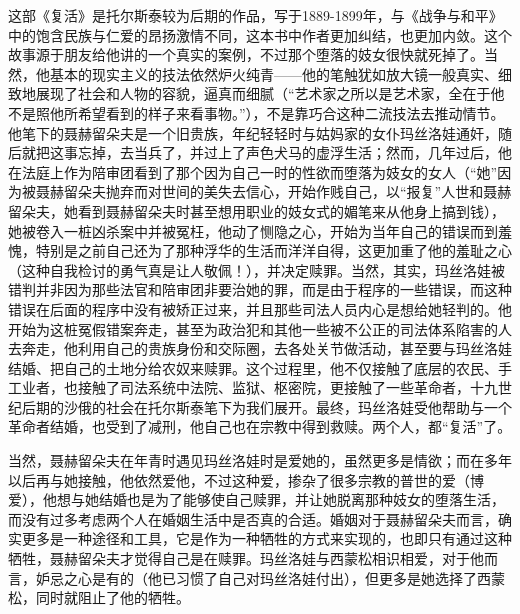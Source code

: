 这部《复活》是托尔斯泰较为后期的作品，写于1889-1899年，与《战争与和平》中的饱含民族与仁爱的昂扬激情不同，这本书中作者更加纠结，也更加内敛。这个故事源于朋友给他讲的一个真实的案例，不过那个堕落的妓女很快就死掉了。当然，他基本的现实主义的技法依然炉火纯青——他的笔触犹如放大镜一般真实、细致地展现了社会和人物的容貌，逼真而细腻（“艺术家之所以是艺术家，全在于他不是照他所希望看到的样子来看事物。”），不是靠巧合这种二流技法去推动情节。他笔下的聂赫留朵夫是一个旧贵族，年纪轻轻时与姑妈家的女仆玛丝洛娃通奸，随后就把这事忘掉，去当兵了，并过上了声色犬马的虚浮生活；然而，几年过后，他在法庭上作为陪审团看到了那个因为自己一时的性欲而堕落为妓女的女人（“她”因为被聂赫留朵夫抛弃而对世间的美失去信心，开始作贱自己，以“报复”人世和聂赫留朵夫，她看到聂赫留朵夫时甚至想用职业的妓女式的媚笔来从他身上搞到钱），她被卷入一桩凶杀案中并被冤枉，他动了恻隐之心，开始为当年自己的错误而到羞愧，特别是之前自己还为了那种浮华的生活而洋洋自得，这更加重了他的羞耻之心（这种自我检讨的勇气真是让人敬佩！），并决定赎罪。当然，其实，玛丝洛娃被错判并非因为那些法官和陪审团非要治她的罪，而是由于程序的一些错误，而这种错误在后面的程序中没有被矫正过来，并且那些司法人员内心是想给她轻判的。他开始为这桩冤假错案奔走，甚至为政治犯和其他一些被不公正的司法体系陷害的人去奔走，他利用自己的贵族身份和交际圈，去各处关节做活动，甚至要与玛丝洛娃结婚、把自己的土地分给农奴来赎罪。这个过程里，他不仅接触了底层的农民、手工业者，也接触了司法系统中法院、监狱、枢密院，更接触了一些革命者，十九世纪后期的沙俄的社会在托尔斯泰笔下为我们展开。最终，玛丝洛娃受他帮助与一个革命者结婚，也受到了减刑，他自己也在宗教中得到救赎。两个人，都“复活”了。

当然，聂赫留朵夫在年青时遇见玛丝洛娃时是爱她的，虽然更多是情欲；而在多年以后再与她接触，他依然爱他，不过这种爱，掺杂了很多宗教的普世的爱（博爱），他想与她结婚也是为了能够使自己赎罪，并让她脱离那种妓女的堕落生活，而没有过多考虑两个人在婚姻生活中是否真的合适。婚姻对于聂赫留朵夫而言，确实更多是一种途径和工具，它是作为一种牺牲的方式来实现的，也即只有通过这种牺牲，聂赫留朵夫才觉得自己是在赎罪。玛丝洛娃与西蒙松相识相爱，对于他而言，妒忌之心是有的（他已习惯了自己对玛丝洛娃付出），但更多是她选择了西蒙松，同时就阻止了他的牺牲。

